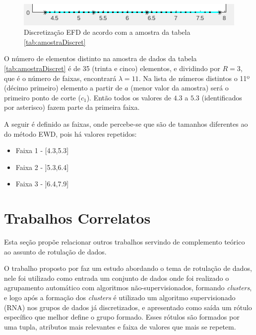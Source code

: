 \begin{figure}[h] 
        \centering
        \includegraphics[scale=0.9]{figs/efd_fisheriris_col1.png}
        \caption{Discretização EFD de acordo com a amostra da tabela \ref{tab:amostraDiscret}}%
        \label{fig:faixasFihseririsExemploEFD}
\end{figure}

O número de elementos distinto na amostra de dados da tabela \ref{tab:amostraDiscret} é de 35 (trinta e cinco) elementos, e dividindo por ${R=3}$, que é o número de faixas, encontrará ${\lambda=11}$. Na lista de números distintos o 11º (décimo primeiro) elemento a partir de ${a}$ (menor valor da amostra) será o primeiro ponto de corte (${c_1}$). Então todos os valores de ${4.3}$ a ${5.3}$ (identificados por asterisco) fazem parte da primeira faixa.

A seguir é definido as faixas, onde percebe-se que são de tamanhos diferentes ao do método EWD, pois há valores repetidos:

\vspace{-3mm}
\begin{itemize}[noitemsep]
 \item Faixa 1 - [4.3,5.3]
 \item Faixa 2 - ]5.3,6.4]
 \item Faixa 3 - ]6.4,7.9]

\end{itemize}


 

\section{Trabalhos Correlatos}\label{cap:refTeor:sec:trabcorrel}

Esta seção propõe relacionar outros trabalhos servindo de complemento teórico  ao assunto de rotulação de dados.

O trabalho proposto por \cite{Lopes2016} faz um estudo abordando o tema de rotulação de dados, nele foi utilizado como entrada um conjunto de dados onde foi realizado o agrupamento automático com algoritmos não-supervisionados, formando  \textit{clusters}, e logo após a formação dos \textit{clusters} é utilizado um algoritmo supervisionado (RNA) nos grupos de dados já discretizados, e apresentado como saída um rótulo específico que melhor define o grupo formado. Esses rótulos são formados por uma tupla, atributos mais relevantes e faixa de valores que mais se repetem.

